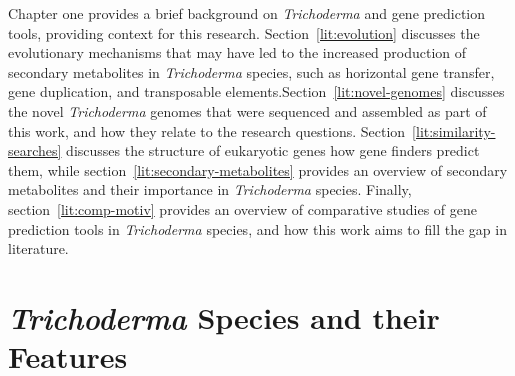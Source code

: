 
Chapter one provides a brief background on \textit{Trichoderma} and gene prediction tools, providing context for this research. Section~\ref{lit:evolution} discusses the evolutionary mechanisms that may have led to the increased production of secondary metabolites in \textit{Trichoderma} species, such as horizontal gene transfer, gene duplication, and transposable elements.Section~\ref{lit:novel-genomes} discusses the novel \textit{Trichoderma} genomes that were sequenced and assembled as part of this work, and how they relate to the research questions. Section~\ref{lit:similarity-searches} discusses the structure of eukaryotic genes how gene finders predict them, while section~\ref{lit:secondary-metabolites} provides an overview of secondary metabolites and their importance in \textit{Trichoderma} species. Finally, section~\ref{lit:comp-motiv} provides an overview of comparative studies of gene prediction tools in \textit{Trichoderma} species, and how this work aims to fill the gap in literature.

\section{\textit{Trichoderma} Species and their Features}
\label{lit:features}

